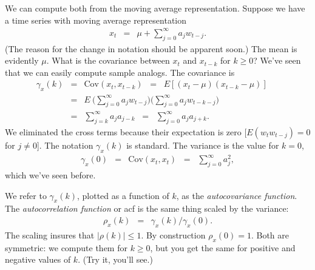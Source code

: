 \documentclass[11pt]{article}
\begin{document}
We can compute both from the moving average representation.
Suppose we have a time series with moving average representation
\begin{eqnarray*}
    x_t &=& \mu + \sum_{j=0}^\infty a_j w_{t-j} .
\end{eqnarray*}
(The reason for the change in notation should be apparent soon.)
The mean is evidently $\mu$.
What is the covariance between $x_t$ and $x_{t-k}$ for $k \geq 0$?
We've seen that we can easily compute sample analogs.
The covariance is
\begin{eqnarray*}
    \gamma_x(k)  &=& \mbox{Cov} (x_t,x_{t-k}) \;\;=\;\;
                 E \left[ (x_t - \mu) (x_{t-k} - \mu)\right] \phantom{\sum}\\
                &=&  E \ \Big( \sum_{j=0}^\infty a_j w_{t-j} \Big)
                  \Big( \sum_{j=0}^\infty a_j w_{t-k-j} \Big) \\
                &=&   \sum_{j=k}^\infty a_j a_{j-k}
                \;\;=\;\; \sum_{j=0}^\infty a_j a_{j+k} .
\end{eqnarray*}
We eliminated the cross terms because their expectation is zero
[$E (w_t w_{t-j}) = 0$ for $j\neq 0$].
The notation $\gamma_x(k)$ is standard.
The variance is the value for $k=0$,
\begin{eqnarray}
    \gamma_x(0)  &=& \mbox{Cov} (x_t,x_{t})
                \;\;=\;\;   \sum_{j=0}^\infty a_j^2  ,
                \label{eq:acf-from-ma}
\end{eqnarray}
which we've seen before.

We refer to $\gamma_x(k)$, plotted as a function of $k$,
as the {\it autocovariance function\/}.
The {\it autocorrelation function\/} or acf is the same thing scaled by the variance:
\begin{eqnarray*}
    \rho_x(k)  &=& \gamma_x(k)/\gamma_x(0) .
\end{eqnarray*}
The scaling insures that $|\rho(k)| \leq 1$.
By construction $\rho_x(0) = 1$.
Both are symmetric:  we compute them for $k\geq 0$,
but you get the same for positive and negative values of $k$.
(Try it, you'll see.)
\end{document}
